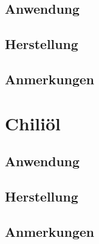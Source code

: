 \subsection{Anwendung}

\subsection{Herstellung}

\subsection{Anmerkungen}



\section{Chiliöl}

\subsection{Anwendung}

\subsection{Herstellung}

\subsection{Anmerkungen}